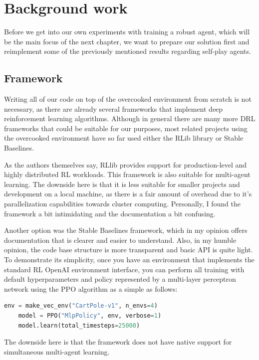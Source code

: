 \chapter{Background work}\label{BackgroundChapter}
Before we get into our own experiments with training a robust agent, which will be the main focus of the next chapter, we want to prepare our solution first and reimplement some of the previously mentioned results regarding self-play agents.

\section{Framework}
Writing all of our code on top of the overcooked environment from scratch is not necessary, as there are already several frameworks that implement deep reinforcement learning algorithms.
Although in general there are many more DRL frameworks that could be suitable for our purposes, most related projects using the overcooked environment have so far used either the RLib library or Stable Baselines.

As the authors themselves say, RLlib provides support for production-level and highly distributed RL workloads.
This framework is also suitable for multi-agent learning.
The downside here is that it is less suitable for smaller projects and development on a local machine, as there is a fair amount of overhead due to it's parallelization capabilities towards cluster computing.
Personally, I found the framework a bit intimidating and the documentation a bit confusing.

Another option was the Stable Baselines framework, which in my opinion offers documentation that is clearer and easier to understand.
Also, in my humble opinion, the code base structure is more transparent and basic API is quite light.
To demonstrate its simplicity, once you have an environment that implements the standard RL OpenAI environment interface, you can perform all training with default hyperparameters and policy represented by a multi-layer perceptron network using the PPO algorithm as a simple as follows:
\begin{lstlisting}[language=Python]
    env = make_vec_env("CartPole-v1", n_envs=4)
    model = PPO("MlpPolicy", env, verbose=1)
    model.learn(total_timesteps=25000)

\end{lstlisting}
The downside here is that the framework does not have native support for simultaneous multi-agent learning.

